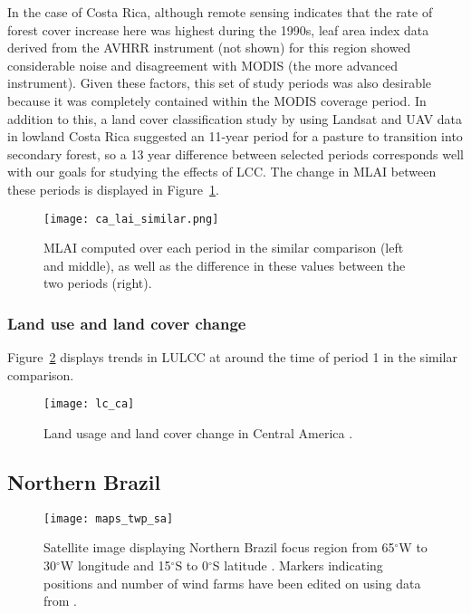 In the case of Costa Rica, although remote sensing indicates that the rate of forest cover increase here was highest during the 1990s, leaf area index data derived from the \ac{AVHRR} instrument (not shown) for this region showed considerable noise and disagreement with \ac{MODIS} (the more advanced instrument). Given these factors, this set of study periods was also desirable because it was completely contained within the \ac{MODIS} coverage period. In addition to this, a land cover classification study by \citet{marx2017} using Landsat and \ac{UAV} data in lowland Costa Rica suggested an 11-year period for a pasture to transition into secondary forest, so a 13 year difference between selected periods corresponds well with our goals for studying the effects of \ac{LCC}. The change in \ac{MLAI} between these periods is displayed in Figure~\ref{fig:ca_lai_similar}.

\begin{figure}[!ht]
	\centering
	\texttt{[image: ca\_lai\_similar.png]}
	\caption[MLAI similar comparison for CA focus region]{\ac{MLAI} computed over each period in the similar comparison (left and middle), as well as the difference in these values between the two periods (right).}
	\label{fig:ca_lai_similar}
\end{figure}

\subsubsection{Land use and land cover change}

Figure~\ref{fig:lc_ca} displays trends in \ac{LULCC} at around the time of period 1 in the similar comparison.

\begin{figure}[!ht]
	\centering
	\texttt{[image: lc\_ca]}
	\caption[Central America Land Usage]{Land usage and land cover change in Central America \citep{ipcc_2007}.}
	\label{fig:lc_ca}
\end{figure}

\subsection{Northern Brazil}

\begin{figure}[!ht]
	\centering
	\texttt{[image: maps\_twp\_sa]}
	\caption[Northern Brazil Map]{Satellite image displaying Northern Brazil focus region from 65$^\circ$W to 30$^\circ$W longitude and 15$^\circ$S to 0$^\circ$S latitude \citep{maps_sa}. Markers indicating positions and number of wind farms have been edited on using data from \citep{twp_br}.}
	\label{fig:maps_twp_sa}
\end{figure}

